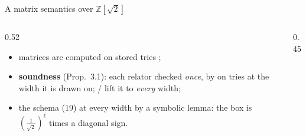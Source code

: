 \begin{frame}{A matrix semantics over $\mathbb{Z}[\sqrt2]$ \New}
\begin{columns}[c]
\begin{column}{0.52\textwidth}
\begin{code}
\AgdaSymbol{)}\AgdaSpace{}%
\AgdaSpace{}%
\AgdaSpace{}%
\AgdaSymbol{)}\<%
\end{code}
\begin{code}[hide]%
\>[0]\AgdaSpace{}%
\AgdaSpace{}%
\AgdaSymbol{:}\AgdaSpace{}%
\AgdaSpace{}%
\AgdaSymbol{\{}\AgdaSymbol{\}}\AgdaSpace{}%
\AgdaSpace{}%
\AgdaSpace{}%
\AgdaSpace{}%
\AgdaSpace{}%
\AgdaSpace{}%
\<%
\end{code}
\begin{itemize}
  \item matrices are computed on stored \alert{tries} ;
  \item \textbf{soundness} (Prop.\ 3.1): each relator checked \emph{once}, by
         on tries at the width it is drawn on;  /
         lift it to \emph{every} width;
  \item the schema (19) at every width by a symbolic lemma: the box is
        $(\frac1{\sqrt2})^\ell$ times a diagonal sign.
\end{itemize}
\end{column}
\begin{column}{0.45\textwidth}
\centering
{}


\end{column}
\end{columns}
\end{frame}
